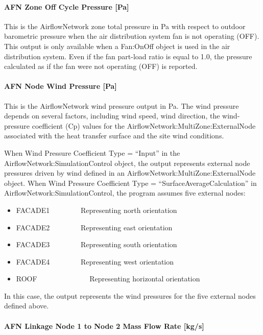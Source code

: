 \paragraph{AFN Zone Off Cycle Pressure {[}Pa{]}}\label{afn-zone-off-cycle-pressure-pa}

This is the AirflowNetwork zone total pressure in Pa with respect to outdoor barometric pressure when the air distribution system fan is not operating (OFF). This output is only available when a Fan:OnOff object is used in the air distribution system. Even if the fan part-load ratio is equal to 1.0, the pressure calculated as if the fan were not operating (OFF) is reported.

\paragraph{AFN Node Wind Pressure {[}Pa{]}}\label{afn-node-wind-pressure-pa}

This is the AirflowNetwork wind pressure output in Pa. The wind pressure depends on several factors, including wind speed, wind direction, the wind-pressure coefficient (Cp) values for the AirflowNetwork:MultiZone:ExternalNode associated with the heat transfer surface and the site wind conditions.

When Wind Pressure Coefficient Type = ``Input'' in the AirflowNetwork:SimulationControl object, the output represents external node pressures driven by wind defined in an AirflowNetwork:MultiZone:ExternalNode object. When Wind Pressure Coefficient Type = ``SurfaceAverageCalculation'' in AirflowNetwork:SimulationControl, the program assumes five external nodes:

\begin{itemize}
\item
  FACADE1~~~~~~~~ Representing north orientation
\item
  FACADE2~~~~~~~~ Representing east orientation
\item
  FACADE3~~~~~~~~ Representing south orientation
\item
  FACADE4~~~~~~~~ Representing west orientation
\item
  ROOF~~~~~~~~~~~~~~ Representing horizontal orientation
\end{itemize}

In this case, the output represents the wind pressures for the five external nodes defined above.

\paragraph{AFN Linkage Node 1 to Node 2 Mass Flow Rate {[}kg/s{]}}\label{afn-linkage-node-1-to-node-2-mass-flow-rate-kgs}


